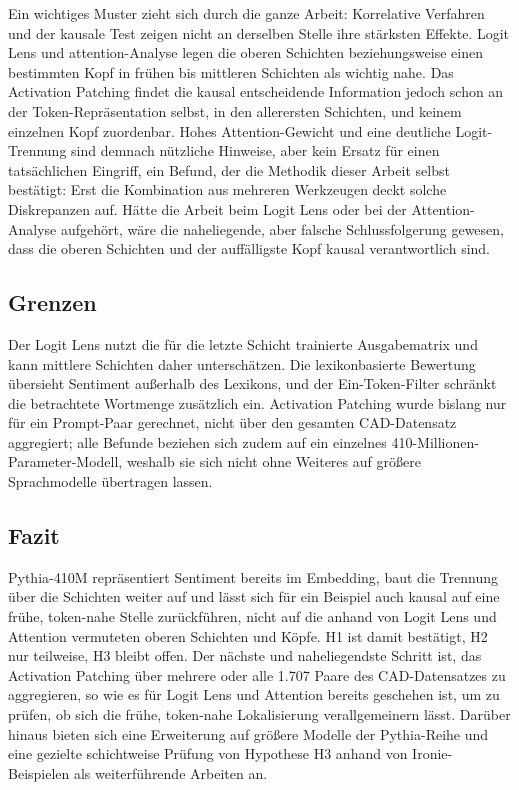 Ein wichtiges Muster zieht sich durch die ganze Arbeit: Korrelative Verfahren und der kausale Test zeigen nicht an derselben Stelle ihre stärksten Effekte. Logit Lens und \gls{attention}-Analyse legen die oberen Schichten beziehungsweise einen bestimmten Kopf in frühen bis mittleren Schichten als wichtig nahe. Das Activation Patching findet die kausal entscheidende Information jedoch schon an der Token-Repräsentation selbst, in den allerersten Schichten, und keinem einzelnen Kopf zuordenbar. Hohes Attention-Gewicht und eine deutliche Logit-Trennung sind demnach nützliche Hinweise, aber kein Ersatz für einen tatsächlichen Eingriff, ein Befund, der die Methodik dieser Arbeit selbst bestätigt: Erst die Kombination aus mehreren Werkzeugen deckt solche Diskrepanzen auf. Hätte die Arbeit beim Logit Lens oder bei der Attention-Analyse aufgehört, wäre die naheliegende, aber falsche Schlussfolgerung gewesen, dass die oberen Schichten und der auffälligste Kopf kausal verantwortlich sind.

\subsection{Grenzen}

Der Logit Lens nutzt die für die letzte Schicht trainierte Ausgabematrix und kann mittlere Schichten daher unterschätzen. Die lexikonbasierte Bewertung übersieht Sentiment außerhalb des Lexikons, und der Ein-Token-Filter schränkt die betrachtete Wortmenge zusätzlich ein. Activation Patching wurde bislang nur für ein Prompt-Paar gerechnet, nicht über den gesamten CAD-Datensatz aggregiert; alle Befunde beziehen sich zudem auf ein einzelnes 410-Millionen-Parameter-Modell, weshalb sie sich nicht ohne Weiteres auf größere Sprachmodelle übertragen lassen.

\subsection{Fazit}

Pythia-410M repräsentiert Sentiment bereits im Embedding, baut die Trennung über die Schichten weiter auf und lässt sich für ein Beispiel auch kausal auf eine frühe, token-nahe Stelle zurückführen, nicht auf die anhand von Logit Lens und Attention vermuteten oberen Schichten und Köpfe. H1 ist damit bestätigt, H2 nur teilweise, H3 bleibt offen. Der nächste und naheliegendste Schritt ist, das Activation Patching über mehrere oder alle 1.707 Paare des CAD-Datensatzes zu aggregieren, so wie es für Logit Lens und Attention bereits geschehen ist, um zu prüfen, ob sich die frühe, token-nahe Lokalisierung verallgemeinern lässt. Darüber hinaus bieten sich eine Erweiterung auf größere Modelle der Pythia-Reihe und eine gezielte schichtweise Prüfung von Hypothese H3 anhand von Ironie-Beispielen als weiterführende Arbeiten an.
